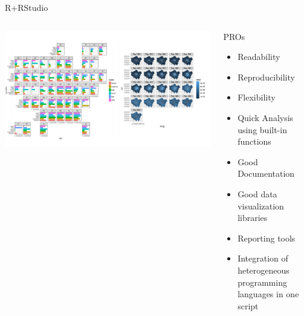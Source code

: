 \documentclass[aspectratio=169,10pt]{beamer}
\begin{document}
\begin{frame}[fragile]{R+RStudio}
\begin{columns}
\begin{column}{0.65\textwidth}
\includegraphics[width=\textwidth]{amal-fr3.pdf}
\end{column}
\begin{column}{0.35\textwidth}
 \begin{alertblock}{PROs}
\begin{itemize}
    \item Readability
    \item Reproducibility 
     \item Flexibility
    \item Quick Analysis using built-in functions
   \item  Good Documentation
\item  Good data visualization libraries 
\item Reporting tools 
\item Integration of heterogeneous programming languages in one script 
\end{itemize}
\end{alertblock}
\end{column}
\end{columns}
\end{frame}
\end{document}
